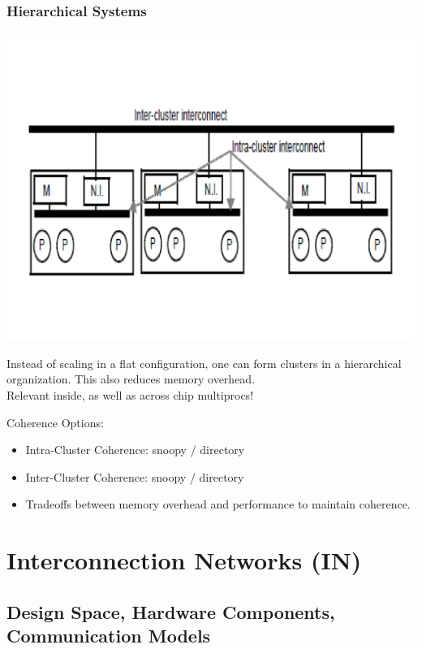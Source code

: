 \documentclass{beamer}
\newcommand{\emp}[1]{\textcolor{DikuRed}{ #1}}
\begin{document}
\begin{frame}[fragile,t]
\frametitle{Hierarchical Systems}

\vspace{-7ex}
\includegraphics[width=44ex]{Figures/FigsInfCoherence/HierarchSys}
\vspace{-5ex}

Instead of scaling in a flat configuration, one can form clusters
in a hierarchical organization.   This also reduces memory overhead.\\  
Relevant inside, as well as across chip multiprocs!
\bigskip

\emp{Coherence Options:}
\begin{itemize}
    \item Intra-Cluster Coherence: snoopy / directory
    \item Inter-Cluster Coherence: snoopy / directory
    \item \alert{Tradeoffs} between memory overhead and performance to maintain coherence.
\end  {itemize}
\end{frame}


\section{Interconnection Networks (IN)}

\subsection{Design Space, Hardware Components, Communication Models}

\begin{frame}[fragile]
	\tableofcontents[currentsection]
\end{frame}
\end{document}
